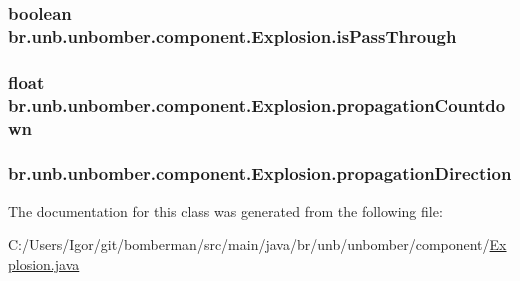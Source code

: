 \hypertarget{classbr_1_1unb_1_1unbomber_1_1component_1_1_explosion_a09d4a0871d67a4a12a815b354b2272c4}{
\subsubsection[{is\+Pass\+Through}]{\setlength{\rightskip}{0pt plus 5cm}boolean br.\+unb.\+unbomber.\+component.\+Explosion.\+is\+Pass\+Through\hspace{0.3cm}{\ttfamily [private]}}}\label{classbr_1_1unb_1_1unbomber_1_1component_1_1_explosion_a09d4a0871d67a4a12a815b354b2272c4}
\hypertarget{classbr_1_1unb_1_1unbomber_1_1component_1_1_explosion_aafd696323afc7a973bb855591c6da12c}{
\subsubsection[{propagation\+Countdown}]{\setlength{\rightskip}{0pt plus 5cm}float br.\+unb.\+unbomber.\+component.\+Explosion.\+propagation\+Countdown\hspace{0.3cm}{\ttfamily [private]}}}\label{classbr_1_1unb_1_1unbomber_1_1component_1_1_explosion_aafd696323afc7a973bb855591c6da12c}
\hypertarget{classbr_1_1unb_1_1unbomber_1_1component_1_1_explosion_abf7db2b0cd2eeb4358b6732b07d8e3d1}{
\subsubsection[{propagation\+Direction}]{ br.\+unb.\+unbomber.\+component.\+Explosion.\+propagation\+Direction\hspace{0.3cm}{\ttfamily [private]}}}\label{classbr_1_1unb_1_1unbomber_1_1component_1_1_explosion_abf7db2b0cd2eeb4358b6732b07d8e3d1}


The documentation for this class was generated from the following file\+:\begin{DoxyCompactItemize}
\item 
C\+:/\+Users/\+Igor/git/bomberman/src/main/java/br/unb/unbomber/component/\hyperlink{_explosion_8java}{Explosion.\+java}\end{DoxyCompactItemize}
